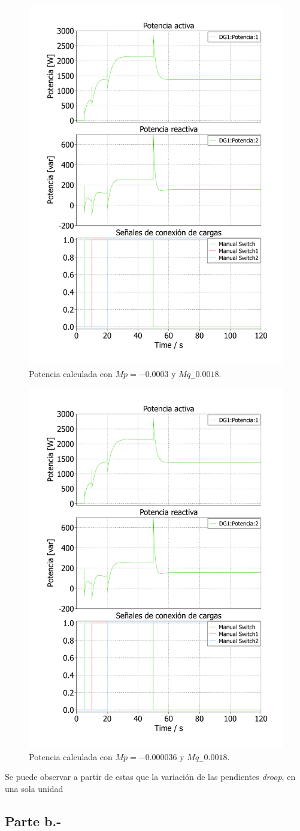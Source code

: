 \begin{figure}
   \centering
   \includegraphics[width=0.5\linewidth]{Tarea 1/report/imagenes/p3a/droop_2.pdf}
   \caption{Potencia calculada con $Mp = -0.0003$ y $Mq_-0.0018$.}
   \label{droop_2}
\end{figure}

\begin{figure}
   \centering
   \includegraphics[width=0.5\linewidth]{Tarea 1/report/imagenes/p3a/droop_3.pdf}
   \caption{Potencia calculada con $Mp = -0.000036$ y $Mq_-0.0018$.}
   \label{droop_3}
\end{figure}

Se puede observar a partir de estas que la variación de las pendientes \textit{droop}, en una sola unidad

\subsection{Parte b.-}


